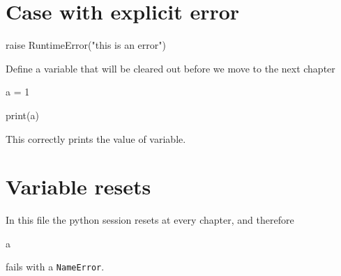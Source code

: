 \documentclass{book}
\begin{document}
\chapter{Case with explicit error}

\begin{pycell}
raise RuntimeError("this is an error")
\end{pycell}

Define a variable that will be cleared out before we move to the next chapter

\begin{pycell}
a = 1
\end{pycell}

\begin{pycell}
print(a)
\end{pycell}

This correctly prints the value of variable.

\chapter{Variable resets}

In this file the python session resets at every chapter, and therefore

\begin{pycell}
a
\end{pycell}

fails with a \texttt{NameError}.

\ifPythonTeXLoaded
\else
\fi
\end{document}

